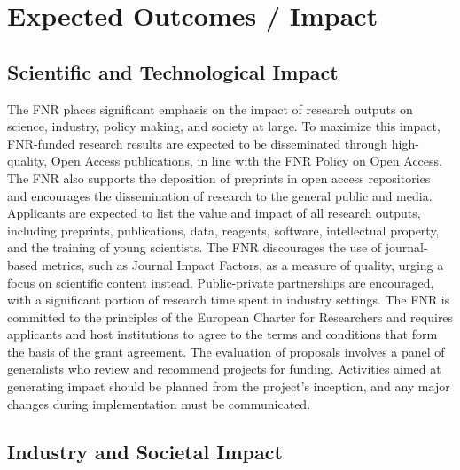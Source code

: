 \documentclass{article}
\begin{document}
\section{Expected Outcomes / Impact}

\subsection{Scientific and Technological Impact}

The FNR places significant emphasis on the impact of research outputs on science, industry, policy making, and society at large. To maximize this impact, FNR-funded research results are expected to be disseminated through high-quality, Open Access publications, in line with the FNR Policy on Open Access. The FNR also supports the deposition of preprints in open access repositories and encourages the dissemination of research to the general public and media. Applicants are expected to list the value and impact of all research outputs, including preprints, publications, data, reagents, software, intellectual property, and the training of young scientists. The FNR discourages the use of journal-based metrics, such as Journal Impact Factors, as a measure of quality, urging a focus on scientific content instead. Public-private partnerships are encouraged, with a significant portion of research time spent in industry settings. The FNR is committed to the principles of the European Charter for Researchers and requires applicants and host institutions to agree to the terms and conditions that form the basis of the grant agreement. The evaluation of proposals involves a panel of generalists who review and recommend projects for funding. Activities aimed at generating impact should be planned from the project's inception, and any major changes during implementation must be communicated.

\subsection{Industry and Societal Impact}
\end{document}
